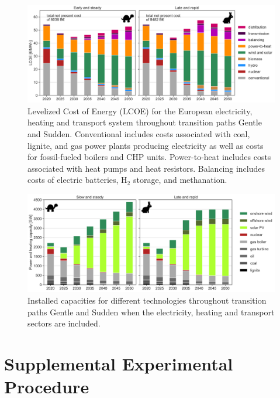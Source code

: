 \documentclass[3p]{elsarticle} %
\begin{document}
\begin{figure}[!h]
	\centering
	\includegraphics[width=\columnwidth]{../figures/LCOE_w_EV_exp.png}
	\caption{Levelized Cost of Energy (LCOE) for the European electricity, heating and transport system throughout transition paths Gentle and Sudden. Conventional includes costs associated with coal, lignite, and gas power plants producing electricity as well as costs for fossil-fueled boilers and CHP units. Power-to-heat includes costs associated with heat pumps and heat resistors. Balancing includes costs of electric batteries, H$_2$ storage, and methanation.} 
\end{figure}
\clearpage

\begin{figure}[!h]
	\centering
	\includegraphics[width=\columnwidth]{../figures/installed_capacity_w_EV_exp.png}
	\caption{Installed capacities for different technologies throughout transition paths Gentle and Sudden when the electricity, heating and transport sectors are included. } 
\end{figure}
\clearpage

\section{Supplemental Experimental Procedure}

\end{document}
